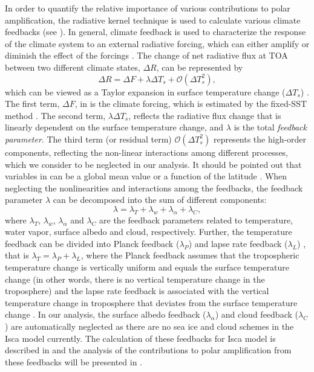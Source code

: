 In order to quantify the relative importance of various contributions to polar amplification, the radiative kernel technique \citep{Soden2008,Shell2008} is used to calculate various climate feedbacks (see ). In general, climate feedback is used to characterize the response of the climate system to an external radiative forcing, which can either amplify or diminish the effect of the forcings \citep{Hansen1984}. The change of net radiative flux at TOA between two different climate states, $\Delta R$, can be represented by
\begin{equation}
    \Delta R = \Delta F+\lambda \Delta T_s + \mathcal{O}\left( \Delta T_s^2 \right),
\label{eq:delta_R_relation}
\end{equation}
which can be viewed as a Taylor expansion in surface temperature change ($\Delta T_s$) \citep{Feldl2013a}. The first term, $\Delta F$, in  is the climate forcing, which is estimated by the fixed-SST method \citep{Hansen2005,Feldl2013a,Kim2018}. The second term, $\lambda \Delta T_s$, reflects the radiative flux change that is linearly dependent on the surface temperature change, and $\lambda$ is the total \textit{feedback parameter}. The third term (or residual term) $ \mathcal{O}\left(\Delta T_s^2 \right)$ represents the high-order components, reflecting the non-linear interactions among different processes, which we consider to be neglected in our analysis. It should be pointed out that variables in  can be a global mean value or a function of the latitude \citep{Feldl2013a}. When neglecting the nonlinearities and interactions among the feedbacks, the feedback parameter $\lambda$ can be decomposed into the sum of different components:
\begin{equation}
\lambda=\lambda_T+\lambda_{w} +\lambda_\alpha+\lambda_C,
\label{eq:fb_decmop}
\end{equation}
where $\lambda_T$, $\lambda_{w}$, $\lambda_\alpha$ and $\lambda_C$ are the feedback parameters related to temperature, water vapor, surface albedo and cloud, respectively. Further, the temperature feedback can be divided into Planck feedback ($\lambda_P$) and lapse rate  feedback ($\lambda_L$) \citep{Soden2006}, that is $\lambda_T=\lambda_P+\lambda_L$, where the Planck feedback assumes that the tropospheric temperature change is vertically uniform and equals the surface temperature change (in other words, there is no vertical temperature change in the troposphere) and the lapse rate feedback is associated with the vertical temperature change in troposphere that deviates from the surface temperature change \citep{Bony2006,Soden2006,Feldl2017coupled}. In our analysis, the surface albedo feedback ($\lambda_\alpha$) and cloud feedback ($\lambda_C$) are automatically neglected as there are no sea ice and cloud schemes in the Isca model currently. The calculation of these feedbacks for Isca model is described in  and the analysis of the contributions to polar amplification from these feedbacks will be presented in .

